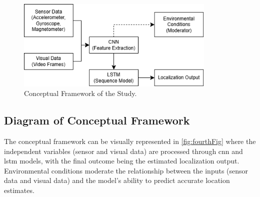 \begin{refsection}
\begin{figure}[H]
    \centering
	\includegraphics[width=0.85\textwidth]{figures/framework.png} 
	\caption[Conceptural Framework]{Conceptual Framework of the Study.}
	\label{fig:forthFig}
\end{figure}

\subsection{Diagram of Conceptual Framework}

The conceptual framework can be visually represented in \ref{fig:fourthFig} where the independent variables (sensor and visual data) are processed through \gls{cnn} and \gls{lstm} models, with the final outcome being the estimated localization output. Environmental conditions moderate the relationship between the inputs (sensor data and visual data) and the model’s ability to predict accurate location estimates.

\clearpage

\printbibliography[heading=subbibintoc, title={\centering Notes}]
\end{refsection}